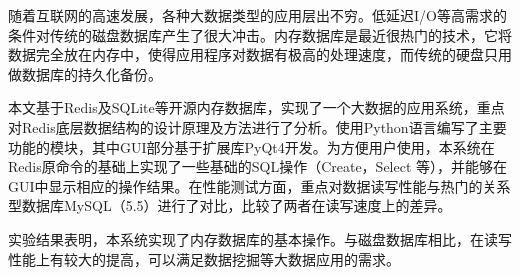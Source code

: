 \begin{abstractc}
随着互联网的高速发展，各种大数据类型的应用层出不穷。低延迟I/O等高需求的条件对传统的磁盘数据库产生了很大冲击。内存数据库是最近很热门的技术，它将数据完全放在内存中，使得应用程序对数据有极高的处理速度，而传统的硬盘只用做数据库的持久化备份。

本文基于Redis及SQLite等开源内存数据库，实现了一个大数据的应用系统，重点对Redis底层数据结构的设计原理及方法进行了分析。使用Python语言编写了主要功能的模块，其中GUI部分基于扩展库PyQt4开发。为方便用户使用，本系统在Redis原命令的基础上实现了一些基础的SQL操作（Create，Select 等），并能够在GUI中显示相应的操作结果。在性能测试方面，重点对数据读写性能与热门的关系型数据库MySQL（5.5）进行了对比，比较了两者在读写速度上的差异。

实验结果表明，本系统实现了内存数据库的基本操作。与磁盘数据库相比，在读写性能上有较大的提高，可以满足数据挖掘等大数据应用的需求。



\end{abstractc}
